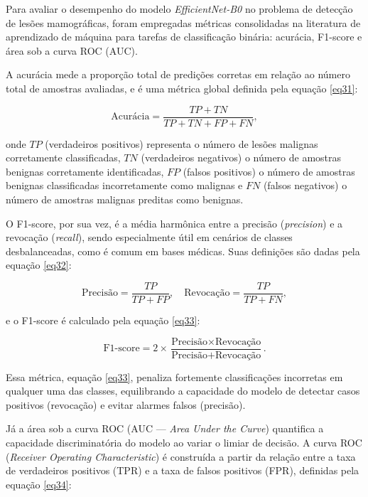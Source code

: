 \documentclass[
	12pt,				%
	openright,			%
	oneside,			%
	a4paper,			%
	tcc,			%
	]{ABNT-DC-UEL}
\begin{document}
Para avaliar o desempenho do modelo \textit{EfficientNet-B0} no problema de detecção de lesões mamográficas, foram empregadas métricas consolidadas na literatura de aprendizado de máquina para tarefas de classificação binária: acurácia, F1-score e área sob a curva ROC (AUC).

A acurácia mede a proporção total de predições corretas em relação ao número total de amostras avaliadas, e é uma métrica global definida pela equação \eqref{eq31}:

\begin{equation}
\text{Acurácia} = \frac{TP + TN}{TP + TN + FP + FN},
\label{eq31}
\end{equation}

\noindent onde $TP$ (verdadeiros positivos) representa o número de lesões malignas corretamente classificadas, $TN$ (verdadeiros negativos) o número de amostras benignas corretamente identificadas, $FP$ (falsos positivos) o número de amostras benignas classificadas incorretamente como malignas e $FN$ (falsos negativos) o número de amostras malignas preditas como benignas.

O F1-score, por sua vez, é a média harmônica entre a precisão (\textit{precision}) e a revocação (\textit{recall}), sendo especialmente útil em cenários de classes desbalanceadas, como é comum em bases médicas. Suas definições são dadas pela equação \eqref{eq32}:

\begin{equation}
\text{Precisão} = \frac{TP}{TP + FP}, \quad
\text{Revocação} = \frac{TP}{TP + FN},
\label{eq32}
\end{equation}

\noindent e o F1-score é calculado pela equação \eqref{eq33}:

\begin{equation}
\text{F1-score} = 2 \times \frac{\text{Precisão} \times \text{Revocação}}{\text{Precisão} + \text{Revocação}}.
\label{eq33}
\end{equation}

Essa métrica, equação \eqref{eq33}, penaliza fortemente classificações incorretas em qualquer uma das classes, equilibrando a capacidade do modelo de detectar casos positivos (revocação) e evitar alarmes falsos (precisão).

Já a área sob a curva ROC (AUC — \textit{Area Under the Curve}) quantifica a capacidade discriminatória do modelo ao variar o limiar de decisão. A curva ROC (\textit{Receiver Operating Characteristic}) é construída a partir da relação entre a taxa de verdadeiros positivos (TPR) e a taxa de falsos positivos (FPR), definidas pela equação \eqref{eq34}:
\end{document}

